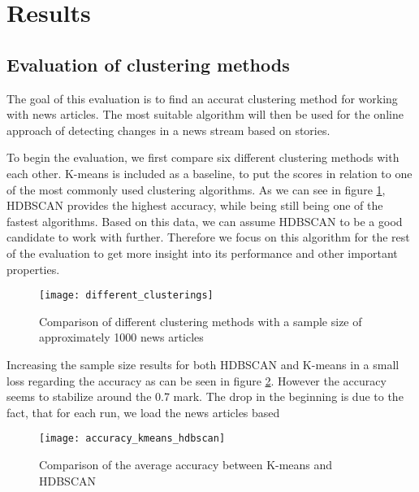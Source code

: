 \section{Results}

\subsection{Evaluation of clustering methods}

The goal of this evaluation is to find an accurat clustering method for working with news articles. The most suitable algorithm will then be used for the online approach of detecting changes in a news stream based on stories.


To begin the evaluation, we first compare six different clustering methods with each other. K-means is included as a baseline, to put the scores in relation to one of the most commonly used clustering algorithms. As we can see in figure \ref{fig:different_clusterings}, HDBSCAN provides the highest accuracy, while being still being one of the fastest algorithms. Based on this data, we can assume HDBSCAN to be a good candidate to work with further. Therefore we focus on this algorithm for the rest of the evaluation to get more insight into its performance and other important properties.

\begin{figure}[h]
    \centering
    \texttt{[image: different\_clusterings]}
    \caption{Comparison of different clustering methods with a sample size of approximately 1000 news articles}
    \label{fig:different_clusterings}
\end{figure}


Increasing the sample size results for both HDBSCAN and K-means in a small loss regarding the accuracy as can be seen in figure \ref{fig:accuracy_kmeans_hdbscan}. However the accuracy seems to stabilize around the 0.7 mark. The drop in the beginning is due to the fact, that for each run, we load the news articles based 


\begin{figure}[h]
    \centering
    \texttt{[image: accuracy\_kmeans\_hdbscan]}
    \caption{Comparison of the average accuracy between K-means and HDBSCAN}
    \label{fig:accuracy_kmeans_hdbscan}
\end{figure}

